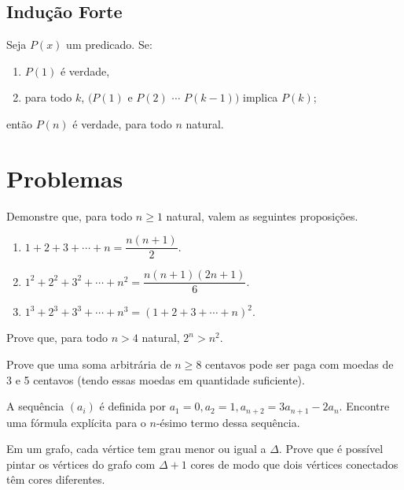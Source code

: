 \documentclass[10pt, a4paper]{article}
\begin{document}
	\subsection{Indução Forte}

	Seja $P(x)$ um predicado. Se:
	\begin{enumerate}[label = --]
		\item $P(1)$ é verdade,
		\item para todo $k$, $\Big( P(1) \text{ e } P(2)$  $\cdots$  $P(k-1) \Big)$ implica $P(k)$;
	\end{enumerate}
	então $P(n)$ é verdade, para todo $n$ natural.

	\newpage

	\section{Problemas}

	\begin{prob}
		Demonstre que, para todo $n \ge 1$ natural, valem as seguintes proposições.
		\begin{enumerate}[label = (\alph*)]
			\item $1 + 2 + 3 + \cdots + n = \dfrac{n(n+1)}{2}.$
			\item $1^2 + 2^2 + 3^2 + \cdots + n^2 = \dfrac{n(n + 1)(2n + 1)}{6}.$
			\item $1^3 + 2^3 + 3^3 + \cdots + n^3 = (1+2+3+\cdots+n)^2.$
		\end{enumerate}
	\end{prob}

	\begin{prob}
		Prove que, para todo $n > 4$ natural, $2^n > n^2$.
	\end{prob}

	\begin{prob}
		Prove que uma soma arbitrária de $n \ge 8$ centavos pode ser paga com moedas de 3 e 5 centavos (tendo essas moedas em quantidade suficiente).
	\end{prob}

	\begin{prob}
		A sequência $(a_i)$ é definida por $a_1 = 0, a_2 = 1, a_{n+2} = 3a_{n+1} - 2a_n$. Encontre uma fórmula explícita para o $n$-ésimo termo dessa sequência.
	\end{prob}

	\begin{prob}
		Em um grafo, cada vértice tem grau menor ou igual a $\Delta$. Prove que é possível pintar os vértices do grafo com $\Delta + 1$ cores de modo que dois vértices conectados têm cores diferentes.
	\end{prob}
\end{document}
